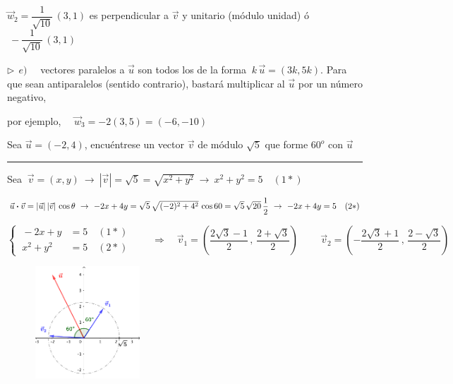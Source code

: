 \begin{miejercicio}
\vspace{2mm} $\vec w_2 = \dfrac{1}{\sqrt{10}}\, (3,1) $ es perpendicular a $\vec v$ y unitario (módulo unidad) \textcolor{gris}{ó $\ -\dfrac{1}{\sqrt{10}}\, (3,1)$}

\vspace{4mm} $\triangleright \ \ e) \quad $ vectores paralelos a $\vec u$ son todos los de la forma $\ k\, \vec u=(3k,5k)$. Para que sean antiparalelos (sentido contrario), bastará multiplicar al $\vec u$ por un número negativo, 

\vspace{2mm} por ejemplo, $\quad \vec w_3=-2(3,5)=(-6,-10)$


	
\end{miejercicio}

\begin{miejercicio}	

Sea $\vec u=(-2,4)$, encuéntrese un vector $\vec v$ de módulo $\sqrt
{5}$ que forme $60^o$ con $\vec u$

\rule{250pt}{0.1pt}

\vspace{2mm} Sea $\ \vec v=(x,y) \ \to \ |\vec v|= \sqrt{5} = \sqrt{x^2+y^2}  \ \to \ x^2+y^2=5\quad (1*)$

\vspace{2mm} $\vec u \vdot \vec v=|\vec u|\, |\vec v|\, \cos \theta \ \to \ -2x+4y=\sqrt 5 \, \sqrt{(-2)^2+4^2}\, \cos 60 = \sqrt{5}\, \sqrt{20}\, \dfrac 1 2 \ \to \ -2x+4y=5\quad (2*)$

\vspace{2mm} $\begin{cases} \ -2x+y&=5 \quad (1*) \\ \ x^2+y^2&=5 \quad (2*)  \end{cases} \qquad \Rightarrow \quad  \vec v_1=\left( \dfrac{2\sqrt{3}-1}{2}\, , \,  \dfrac{2+\sqrt{3}}{2} \right) \qquad  \ \vec v_2=\left( -\dfrac{2\sqrt{3}+1}{2}\, ,\,\dfrac{2-\sqrt{3}}{2}\right)$

\begin{figure}[H]
	\centering
	\includegraphics[width=0.35\textwidth]{img-vec/vec15.png}	
\end{figure}

\end{miejercicio}


